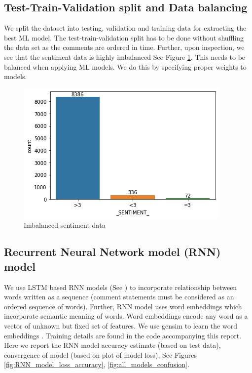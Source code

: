 \documentclass[11pt, letterpaper]{article}
\begin{document}
\subsection{Test-Train-Validation split and Data balancing}
We split the dataset into testing, validation and training data for extracting the best ML model. The test-train-validation split has to be done without shuffling the data set as the comments are ordered in time. Further, upon inspection, we see that the sentiment data is highly imbalanced See Figure \ref{fig:imbalanced_data}. This needs to be balanced when applying ML models. We do this by specifying proper weights to models.
\begin{figure}[H]%
    \centering
    \includegraphics[width=\linewidth]{sentiment_imbalance.png}%
    \caption{Imbalanced sentiment data}%
    \label{fig:imbalanced_data}
\end{figure}

\subsection{Recurrent Neural Network model (RNN) model}
We use LSTM based RNN models (See \autocite{bestrnn}) to incorporate relationship between words written as a sequence (comment statements must be considered as an ordered sequence of words). Further, RNN model uses word embeddings which incorporate semantic meaning of words. Word embeddings \autocite{nlpbasics} encode any word as a vector of unknown but fixed set of features. We use gensim to learn the word embeddings \autocite{gensim}. Training details are found in the code accompanying this report. Here we report the RNN model accuracy estimate (based on test data), convergence of model (based on plot of model loss), See Figures \ref{fig:RNN_model_loss_accuracy}, \ref{fig:all_models_confusion}.
\end{document}
